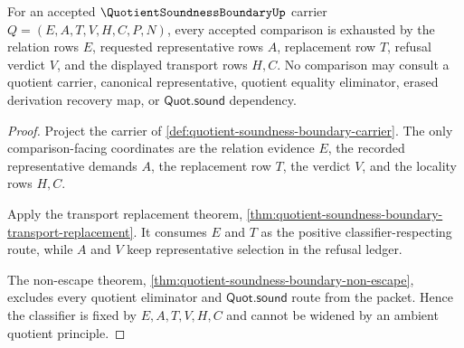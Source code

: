 \begin{theorem}
\label{thm:quotient-soundness-boundary-fixed-classifier}
For an accepted $\QuotientSoundnessBoundaryUp$ carrier $Q=(E,A,T,V,H,C,P,N)$, every accepted comparison is exhausted by the relation rows $E$, requested representative rows $A$, replacement row $T$, refusal verdict $V$, and the displayed transport rows $H,C$. No comparison may consult a quotient carrier, canonical representative, quotient equality eliminator, erased derivation recovery map, or $\mathsf{Quot.sound}$ dependency.
\end{theorem}
\begin{proof}
Project the carrier of \autoref{def:quotient-soundness-boundary-carrier}. The only comparison-facing coordinates are the relation evidence $E$, the recorded representative demands $A$, the replacement row $T$, the verdict $V$, and the locality rows $H,C$.

Apply the transport replacement theorem, \autoref{thm:quotient-soundness-boundary-transport-replacement}. It consumes $E$ and $T$ as the positive classifier-respecting route, while $A$ and $V$ keep representative selection in the refusal ledger.

The non-escape theorem, \autoref{thm:quotient-soundness-boundary-non-escape}, excludes every quotient eliminator and $\mathsf{Quot.sound}$ route from the packet. Hence the classifier is fixed by $E,A,T,V,H,C$ and cannot be widened by an ambient quotient principle.
\end{proof}

